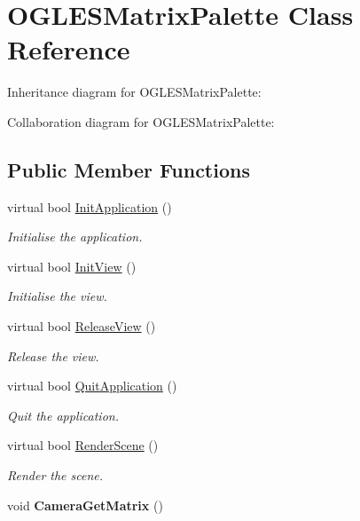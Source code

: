 \hypertarget{class_o_g_l_e_s_matrix_palette}{\section{O\+G\+L\+E\+S\+Matrix\+Palette Class Reference}
\label{class_o_g_l_e_s_matrix_palette}
}


Inheritance diagram for O\+G\+L\+E\+S\+Matrix\+Palette\+:


Collaboration diagram for O\+G\+L\+E\+S\+Matrix\+Palette\+:
\subsection*{Public Member Functions}
\begin{DoxyCompactItemize}
\item 
virtual bool \hyperlink{class_o_g_l_e_s_matrix_palette_a8a9cd578911463d74d550c7cebcba70a}{Init\+Application} ()
\begin{DoxyCompactList}\small\item\em Initialise the application. \end{DoxyCompactList}\item 
virtual bool \hyperlink{class_o_g_l_e_s_matrix_palette_af8d5112ded4ef7e98cf6778a703332de}{Init\+View} ()
\begin{DoxyCompactList}\small\item\em Initialise the view. \end{DoxyCompactList}\item 
virtual bool \hyperlink{class_o_g_l_e_s_matrix_palette_a94d055b06189563824611b3e1e1b4b03}{Release\+View} ()
\begin{DoxyCompactList}\small\item\em Release the view. \end{DoxyCompactList}\item 
virtual bool \hyperlink{class_o_g_l_e_s_matrix_palette_a502b7a23a04c6972d7613ef42658a4f8}{Quit\+Application} ()
\begin{DoxyCompactList}\small\item\em Quit the application. \end{DoxyCompactList}\item 
virtual bool \hyperlink{class_o_g_l_e_s_matrix_palette_a52b71bbd973a3e23bed222a8b6340656}{Render\+Scene} ()
\begin{DoxyCompactList}\small\item\em Render the scene. \end{DoxyCompactList}\item 
\hypertarget{class_o_g_l_e_s_matrix_palette_ae20db3680f038cce84421681f83f3953}{void {\bfseries Camera\+Get\+Matrix} ()}\label{class_o_g_l_e_s_matrix_palette_ae20db3680f038cce84421681f83f3953}


\end{DoxyCompactItemize}
